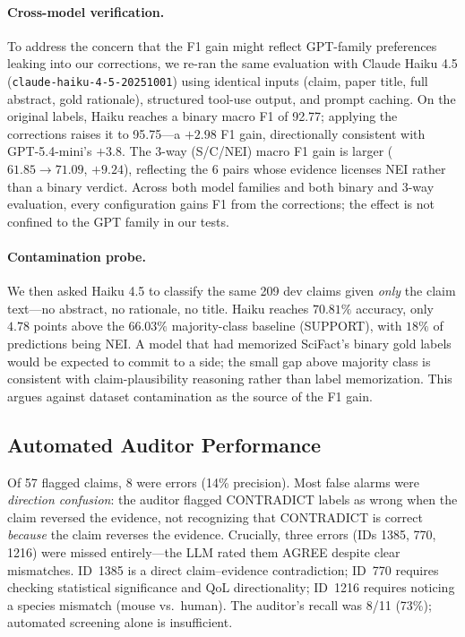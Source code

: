 \documentclass[11pt]{article}
\begin{document}
\paragraph{Cross-model verification.}
To address the concern that the F1 gain might reflect GPT-family preferences leaking into our corrections, we re-ran the same evaluation with Claude Haiku 4.5 (\texttt{claude-haiku-4-5-20251001}) using identical inputs (claim, paper title, full abstract, gold rationale), structured tool-use output, and prompt caching.
On the original labels, Haiku reaches a binary macro F1 of 92.77; applying the corrections raises it to 95.75---a $+2.98$ F1 gain, directionally consistent with GPT-5.4-mini's $+3.8$.
The 3-way (S/C/NEI) macro F1 gain is larger ($61.85 \to 71.09$, $+9.24$), reflecting the 6 pairs whose evidence licenses NEI rather than a binary verdict.
Across both model families and both binary and 3-way evaluation, every configuration gains F1 from the corrections; the effect is not confined to the GPT family in our tests.

\paragraph{Contamination probe.}
We then asked Haiku 4.5 to classify the same 209 dev claims given \emph{only} the claim text---no abstract, no rationale, no title.
Haiku reaches $70.81\%$ accuracy, only $4.78$ points above the $66.03\%$ majority-class baseline (SUPPORT), with $18\%$ of predictions being NEI.
A model that had memorized SciFact's binary gold labels would be expected to commit to a side; the small gap above majority class is consistent with claim-plausibility reasoning rather than label memorization.
This argues against dataset contamination as the source of the F1 gain.

\subsection{Automated Auditor Performance}
\label{sec:auditor-errors}

Of 57 flagged claims, 8 were errors (14\% precision). Most false alarms were \emph{direction confusion}: the auditor flagged CONTRADICT labels as wrong when the claim reversed the evidence, not recognizing that CONTRADICT is correct \emph{because} the claim reverses the evidence.
Crucially, three errors (IDs 1385, 770, 1216) were missed entirely---the LLM rated them AGREE despite clear mismatches.
ID~1385 is a direct claim--evidence contradiction; ID~770 requires checking statistical significance and QoL directionality; ID~1216 requires noticing a species mismatch (mouse vs.\ human).
The auditor's recall was 8/11 (73\%); automated screening alone is insufficient.
\end{document}
